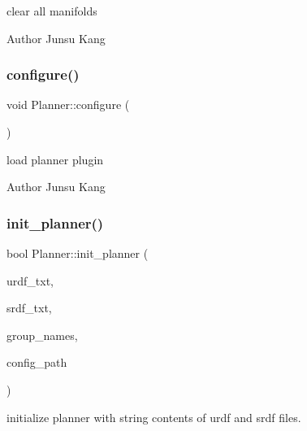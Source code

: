 clear all manifolds 

\begin{DoxyAuthor}{Author}
Junsu Kang 
\end{DoxyAuthor}
\mbox{\label{class_r_n_b_1_1_moveit_compact_1_1_planner_aa89d4eb9a041cd3560a23d01b763e8a5}} 
\subsubsection{\texorpdfstring{configure()}{configure()}}
{\footnotesize\ttfamily void Planner\+::configure (\begin{DoxyParamCaption}{ }\end{DoxyParamCaption})}



load planner plugin 

\begin{DoxyAuthor}{Author}
Junsu Kang 
\end{DoxyAuthor}
\mbox{\label{class_r_n_b_1_1_moveit_compact_1_1_planner_a43e6dccb94ecdf155ab93ee05c47dbe4}} 
\subsubsection{\texorpdfstring{init\+\_\+planner()}{init\_planner()}}
{\footnotesize\ttfamily bool Planner\+::init\+\_\+planner (\begin{DoxyParamCaption}\item[{string \&}]{urdf\+\_\+txt,  }\item[{string \&}]{srdf\+\_\+txt,  }\item[{Name\+List \&}]{group\+\_\+names,  }\item[{string}]{config\+\_\+path }\end{DoxyParamCaption})}



initialize planner with string contents of urdf and srdf files. 


